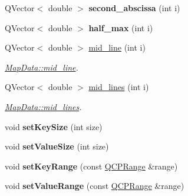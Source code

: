 \begin{DoxyCompactItemize}
\item 
Q\+Vector$<$ double $>$ {\bfseries second\+\_\+abscissa} (int i)\hypertarget{class_map_data_a0cec16c38ea76e32fd5b98f88f55f272}{}\label{class_map_data_a0cec16c38ea76e32fd5b98f88f55f272}

\item 
Q\+Vector$<$ double $>$ {\bfseries half\+\_\+max} (int i)\hypertarget{class_map_data_a534ed582acba267677828d8adee990cb}{}\label{class_map_data_a534ed582acba267677828d8adee990cb}

\item 
Q\+Vector$<$ double $>$ \hyperlink{class_map_data_a1abf4b8f0c1cb51017e6dfffd0e4ff99}{mid\+\_\+line} (int i)
\begin{DoxyCompactList}\small\item\em \hyperlink{class_map_data_a1abf4b8f0c1cb51017e6dfffd0e4ff99}{Map\+Data\+::mid\+\_\+line}. \end{DoxyCompactList}\item 
Q\+Vector$<$ double $>$ \hyperlink{class_map_data_a95f9011ac33e065d58f2bf26b0db9580}{mid\+\_\+lines} (int i)
\begin{DoxyCompactList}\small\item\em \hyperlink{class_map_data_a95f9011ac33e065d58f2bf26b0db9580}{Map\+Data\+::mid\+\_\+lines}. \end{DoxyCompactList}\item 
void {\bfseries set\+Key\+Size} (int size)\hypertarget{class_map_data_a4449d591b36835bfc33e4d4f18a5440f}{}\label{class_map_data_a4449d591b36835bfc33e4d4f18a5440f}

\item 
void {\bfseries set\+Value\+Size} (int size)\hypertarget{class_map_data_a012b63962abf29178802dae20c40d4b8}{}\label{class_map_data_a012b63962abf29178802dae20c40d4b8}

\item 
void {\bfseries set\+Key\+Range} (const \hyperlink{class_q_c_p_range}{Q\+C\+P\+Range} \&range)\hypertarget{class_map_data_a285fff0a4f3362a155df80e0c61bdc45}{}\label{class_map_data_a285fff0a4f3362a155df80e0c61bdc45}

\item 
void {\bfseries set\+Value\+Range} (const \hyperlink{class_q_c_p_range}{Q\+C\+P\+Range} \&range)\hypertarget{class_map_data_a90916d2acda22cd75c03f1daf9481e56}{}\label{class_map_data_a90916d2acda22cd75c03f1daf9481e56}


\end{DoxyCompactItemize}
